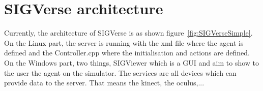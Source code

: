 \noindent\begin{minipage}{\linewidth}%
\label{fig:concept_de_base_ROS}%
\end{minipage}


\section{SIGVerse architecture}
Currently, the architecture of SIGVerse is as shown figure~\ref{fig:SIGVerseSimple}.\\
On the Linux part, the server is running with the xml file where the agent is defined and the Controller.cpp where the initialisation and actions are defined.\\
On the Windows part, two things, SIGViewer which is a GUI and aim to show to the user the agent on the simulator. The services are all devices which can provide data to the server. That means the kinect, the oculus,...\\

\noindent\begin{minipage}{\linewidth}%
\label{fig:SIGVerseSimple}%
\end{minipage}

